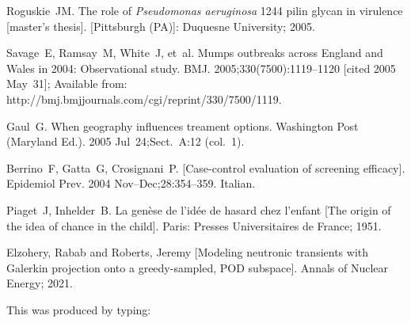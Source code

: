 \documentclass[]{interact}
\theoremstyle{plain}%
\theoremstyle{definition}
\theoremstyle{remark}
\begin{document}
\begin{thebibliography}{99}
Roguskie~JM. The role of \emph{Pseudomonas aeruginosa} 1244 pilin glycan in
  virulence [master's thesis]. [Pittsburgh (PA)]: Duquesne University; 2005.

Savage~E, Ramsay~M, White~J, et~al. Mumps outbreaks across England and Wales
  in 2004: Observational study. BMJ. 2005;330(7500):1119--1120 [cited 2005
  May~31]; Available from: http://bmj.bmjjournals.com/cgi/reprint/330/7500/1119.

Gaul~G. When geography influences treament options. Washington Post (Maryland
  Ed.). 2005 Jul~24;Sect.~A:12 (col.~1).

Berrino~F, Gatta~G, Crosignani~P. [Case-control evaluation of screening
  efficacy]. Epidemiol Prev. 2004 Nov--Dec;28:354--359. Italian.

Piaget~J, Inhelder~B. La gen{\`e}se de l'id{\'e}e de hasard chez l'enfant
  [The origin of the idea of chance in the child]. Paris: Presses
  Universitaires de France; 1951.
  
 Elzohery, Rabab and Roberts, Jeremy [Modeling neutronic transients with Galerkin projection onto a greedy-sampled, POD subspace]. Annals of Nuclear Energy; 2021.


\end{thebibliography}
\bigskip
\noindent This was produced by typing:
\end{document}
